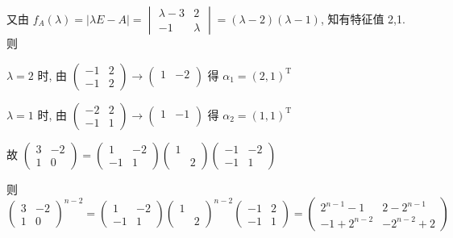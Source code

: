 		 又由 \( f_{A}(\lambda) = |\lambda E - A| = \begin{vmatrix}
			 \lambda-3 & 2       \\
			 -1        & \lambda
		 \end{vmatrix} = (\lambda-2)(\lambda-1) \), 知有特征值 2,1. 则

		 \( \lambda = 2 \) 时, 由 \( \begin{pmatrix}
			 -1 & 2 \\
			 -1 & 2
		 \end{pmatrix} \rightarrow \begin{pmatrix}
			 1 & -2 \\
			   &
		 \end{pmatrix} \) 得 \( \alpha_{1} = (2,1)^{\mathrm{T}} \)

		 \( \lambda = 1 \) 时, 由 \( \begin{pmatrix}
			 -2 & 2 \\
			 -1 & 1
		 \end{pmatrix} \rightarrow \begin{pmatrix}
			 1 & -1 \\
			   &
		 \end{pmatrix} \) 得 \( \alpha_{2} = (1,1)^{\mathrm{T}} \)

		 故 \( \begin{pmatrix}
			 3 & -2 \\
			 1 & 0
		 \end{pmatrix} = \begin{pmatrix}
			 1  & -2 \\
			 -1 & 1
		 \end{pmatrix}\begin{pmatrix}
			 1 &   \\
			   & 2
		 \end{pmatrix}\begin{pmatrix}
			 -1 & -2 \\
			 -1 & 1
		 \end{pmatrix} \)

		 则 \( \begin{pmatrix}
			 3 & -2 \\
			 1 & 0
		 \end{pmatrix}^{n-2} = \begin{pmatrix}
			 1  & -2 \\
			 -1 & 1
		 \end{pmatrix}\begin{pmatrix}
			 1 &   \\
			   & 2
		 \end{pmatrix}^{n-2}\begin{pmatrix}
			 -1 & 2 \\
			 -1 & 1
		 \end{pmatrix} = \begin{pmatrix}
			 2^{n-1}-1  & 2-2^{n-1}  \\
			 -1+2^{n-2} & -2^{n-2}+2
		 \end{pmatrix} \)

